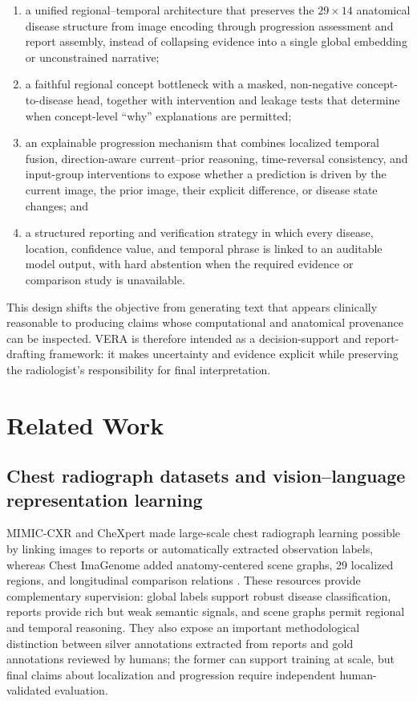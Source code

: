 \documentclass[preprint,12pt]{elsarticle}
\begin{document}
\begin{enumerate}
    \item a unified regional--temporal architecture that preserves the
    $29\times14$ anatomical disease structure from image encoding through
    progression assessment and report assembly, instead of collapsing evidence
    into a single global embedding or unconstrained narrative;

    \item a faithful regional concept bottleneck with a masked, non-negative
    concept-to-disease head, together with intervention and leakage tests that
    determine when concept-level ``why'' explanations are permitted;

    \item an explainable progression mechanism that combines localized temporal
    fusion, direction-aware current--prior reasoning, time-reversal consistency,
    and input-group interventions to expose whether a prediction is driven by
    the current image, the prior image, their explicit difference, or disease
    state changes; and

    \item a structured reporting and verification strategy in which every
    disease, location, confidence value, and temporal phrase is linked to an
    auditable model output, with hard abstention when the required evidence or
    comparison study is unavailable.
\end{enumerate}

This design shifts the objective from generating text that appears clinically
reasonable to producing claims whose computational and anatomical provenance can
be inspected. VERA is therefore intended as a decision-support and report-drafting
framework: it makes uncertainty and evidence explicit while preserving the
radiologist's responsibility for final interpretation.

\section{Related Work}
\label{sec:related_work}

\subsection{Chest radiograph datasets and vision--language representation
learning}

MIMIC-CXR and CheXpert made large-scale chest radiograph learning possible by
linking images to reports or automatically extracted observation labels, whereas
Chest ImaGenome added anatomy-centered scene graphs, 29 localized regions, and
longitudinal comparison relations \cite{johnson2019mimic,irvin2019chexpert,wu2021chestimagenome}.
These resources provide complementary supervision: global labels support robust
disease classification, reports provide rich but weak semantic signals, and
scene graphs permit regional and temporal reasoning. They also expose an
important methodological distinction between silver annotations extracted from
reports and gold annotations reviewed by humans; the former can support training
at scale, but final claims about localization and progression require independent
human-validated evaluation.
\end{document}
